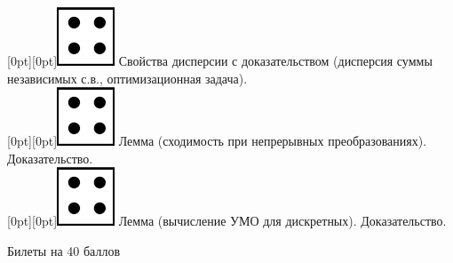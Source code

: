 \documentclass[preview]{standalone}
\begin{document}
\raisebox{-1pt}[0pt][0pt]{\includegraphics[width=0.02\linewidth]{4.png}} Свойства дисперсии с доказательством (дисперсия суммы независимых с.в., оптимизационная задача). \\ 
\raisebox{-1pt}[0pt][0pt]{\includegraphics[width=0.02\linewidth]{4.png}} Лемма  (сходимость при непрерывных преобразованиях). Доказательство. \\
\raisebox{-1pt}[0pt][0pt]{\includegraphics[width=0.02\linewidth]{4.png}} Лемма (вычисление УМО для дискретных). Доказательство. \\


\begin{center}
    Билеты на 40 баллов
\end{center}
\end{document}
